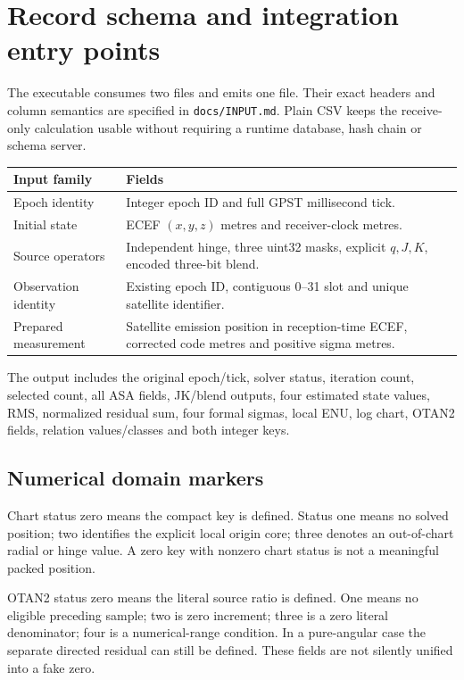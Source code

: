 \documentclass[11pt,a4paper]{article}
\newcommand{\code}[1]{\texttt{#1}}
\begin{document}
\section{Record schema and integration entry points}
The executable consumes two files and emits one file. Their exact headers and column semantics are
specified in \code{docs/INPUT.md}. Plain CSV keeps the receive-only calculation usable without requiring
a runtime database, hash chain or schema server.

\par\small
\begin{tabularx}{\textwidth}{@{}P{.28\textwidth}Y@{}}\toprule
\textbf{Input family} & \textbf{Fields}\\\midrule
Epoch identity & Integer epoch ID and full GPST millisecond tick.\\
Initial state & ECEF $(x,y,z)$ metres and receiver-clock metres.\\
Source operators & Independent hinge, three uint32 masks, explicit $q,J,K$, encoded three-bit blend.\\
Observation identity & Existing epoch ID, contiguous 0--31 slot and unique satellite identifier.\\
Prepared measurement & Satellite emission position in reception-time ECEF, corrected code metres and positive sigma metres.\\\bottomrule
\end{tabularx}
\par\normalsize

The output includes the original epoch/tick, solver status, iteration count, selected count, all ASA fields,
JK/blend outputs, four estimated state values, RMS, normalized residual sum, four formal sigmas, local ENU,
log chart, OTAN2 fields, relation values/classes and both integer keys.

\subsection{Numerical domain markers}
Chart status zero means the compact key is defined. Status one means no solved position; two identifies the
explicit local origin core; three denotes an out-of-chart radial or hinge value. A zero key with nonzero chart
status is not a meaningful packed position.

OTAN2 status zero means the literal source ratio is defined. One means no eligible preceding sample; two is
zero increment; three is a zero literal denominator; four is a numerical-range condition. In a pure-angular
case the separate directed residual can still be defined. These fields are not silently unified into a fake zero.
\end{document}
